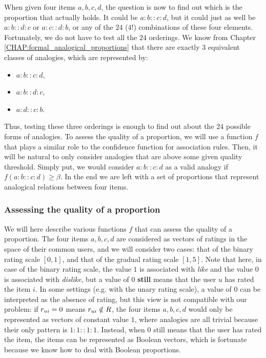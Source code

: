 When given four items $a, b, c, d$, the question is now to find out which is
the proportion that actually holds. It could be $a:b::c:d$, but it could just
as well be $a:b::d:c$ or $a:c::d:b$, or any of the $24$ ($4!$) combinations of
these four elements. Fortunately, we do not have to test all the $24$
orderings.  We know from Chapter \ref{CHAP:formal_analogical_proportions} that
there are exactly 3 equivalent classes of analogies, which are represented by:
\begin{itemize}
  \item $a:b::c:d$,
  \item $a:b::d:c$,
  \item $a:d::c:b$.
\end{itemize}
Thus, testing these three orderings is enough to find out about the $24$
possible forms of analogies. To assess the quality of a proportion, we will
use a function $f$ that plays a similar role to the confidence function for
association rules. Then, it will be natural to only consider analogies that
are above some given quality threshold. Simply put, we would consider
$a:b::c:d$ as a valid analogy if $f(a:b::c:d) \geq \beta$. In the end we are
left with a set of proportions that represent analogical relations between four
items.

\subsubsection{Assessing the quality of a proportion}

We will here describe various functions $f$ that can assess the quality of a
proportion. The four items $a, b, c, d$ are considered as vectors of ratings in
the space of their common users,
and we will consider two cases: that of the binary rating scale $[0, 1]$, and
that of the gradual rating scale $[1, 5]$. Note that here, in case of the
binary rating scale, the value $1$ is associated with \textit{like} and the
value $0$ is associated with \textit{dislike}, but a value of $0$
\textbf{still} means that the user $u$ has rated the item $i$. In some
settings (e.g. with the unary rating scale), a value of $0$ can be interpreted
as the absence of rating, but this view is not compatible with our problem: if
$r_{ui} = 0$ means $r_{ui} \notin R$, the four items $a, b, c, d$ would only be
represented as vectors of constant value $1$, where analogies are all trivial
because their only pattern is $1:1::1:1$. Instead, when $0$ still means that
the user has rated the item, the items can be represented as Boolean vectors,
which is fortunate because we know how to deal with Boolean proportions.

